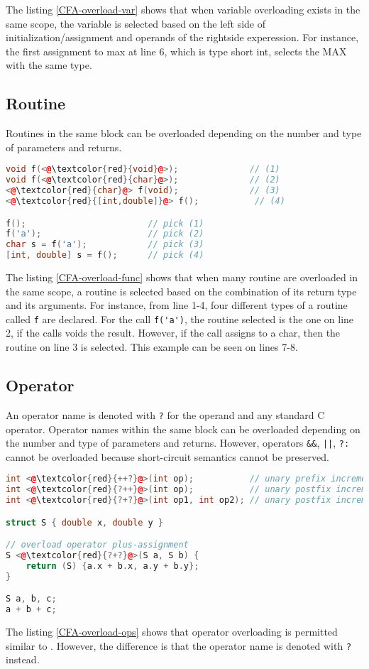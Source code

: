 The listing \ref{CFA-overload-var} shows that when variable overloading exists
in the same scope, the variable is selected based on the left side of
initialization/assignment and operands of the rightside experession. For
instance, the first assignment to max at line 6, which is type short int,
selects the MAX with the same type.

\subsection{Routine}
Routines in the same block can be overloaded depending on the number and type of
parameters and returns.


\begin{lstlisting}[language=C++, caption={Overloading routines in \CFA},
label={CFA-overload-func}]
void f(<@\textcolor{red}{void}@>);              // (1)
void f(<@\textcolor{red}{char}@>);              // (2)
<@\textcolor{red}{char}@> f(void);              // (3)
<@\textcolor{red}{[int,double]}@> f();           // (4)

f();                        // pick (1)
f('a');                     // pick (2)
char s = f('a');            // pick (3)
[int, double] s = f();      // pick (4)
\end{lstlisting}

The listing \ref{CFA-overload-func} shows that when many routine are overloaded in
the same scope, a routine is selected based on the combination of its return type and its
arguments. For instance, from line 1-4, four different types of a routine called
\verb|f| are declared. For the call \verb|f('a')|, the routine selected is the
one on line 2, if the calls voids the result. However, if the call assigns to a
char, then the routine on line 3 is selected. This example can be seen on lines
7-8.

\subsection{Operator}
An operator name is denoted with \verb|?| for the operand and any standard C
operator. Operator names within the same block can be overloaded depending on
the number and type of parameters and returns. However, operators \verb|&&|,
\verb-||-, \verb|?:| cannot be overloaded because short-circuit semantics
cannot be preserved.


\begin{lstlisting}[language=C++, caption={Overloading operators in \CFA},
label={CFA-overload-ops}]
int <@\textcolor{red}{++?}@>(int op);           // unary prefix increment
int <@\textcolor{red}{?++}@>(int op);           // unary postfix increment
int <@\textcolor{red}{?+?}@>(int op1, int op2); // unary postfix increment

struct S { double x, double y }

// overload operator plus-assignment
S <@\textcolor{red}{?+?}@>(S a, S b) {
    return (S) {a.x + b.x, a.y + b.y};
}

S a, b, c;
a + b + c;
\end{lstlisting}

The listing \ref{CFA-overload-ops} shows that operator overloading is permitted
similar to \CCS. However, the difference is that the operator name is
denoted with \verb|?| instead.
